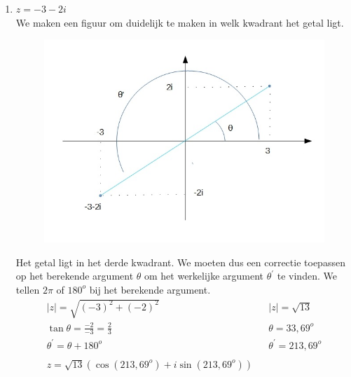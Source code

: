 \begin{enumerate}
	\item $z=-3-2i$ \\ We maken een figuur om duidelijk te maken in welk kwadrant het getal ligt. \\
	\begin{figure}[h]
		\begin{center}
			\includegraphics[scale=0.5]{3_gonio_complexe_getallen/inputs/complex-getal-voorbeeld2.jpg}
		\end{center}
	\end{figure}
	
	Het getal ligt in het derde kwadrant. We moeten dus een correctie toepassen op het berekende argument $\theta$ om het werkelijke argument $\theta^{'}$ te vinden. We tellen  $2\pi$ of $180^{o}$ bij het berekende argument. \\
	\[ \begin{array}{lll}
	|z|=\sqrt{(-3)^2 +(-2)^2} & & |z|=\sqrt{13} \\
	\tan \theta = \frac{-2}{-3}=\frac{2}{3} & & \theta = 33,69^{o}\\
	\theta^{'}=\theta+180^{o} & & \theta^{'}=213,69^{o} \\
	&  &          \\
    z=\sqrt{13} (\cos (213,69^{o}) + i \sin (213,69^{o})) &  & 
	\end{array} \]
	

\end{enumerate}
